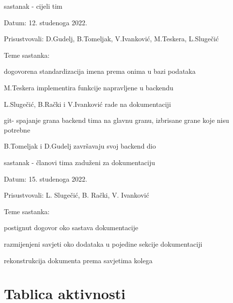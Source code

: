\begin{packed_enum}
			
			\item  sastanak - cijeli tim
			\item[] \begin{packed_item}
				\item Datum: 12. studenoga 2022.
				\item Prisustvovali: D.Gudelj, B.Tomeljak, V.Ivanković, M.Teskera, L.Slugečić
				\item Teme sastanka:
				\begin{packed_item}
					\item dogovorena standardizacija imena prema onima u bazi podataka
					\item M.Teskera implementira funkcije napravljene u backendu
					\item L.Slugečić, B.Rački i V.Ivanković rade na dokumentaciji
					\item git- spajanje grana backend tima na glavnu granu, izbrisane grane koje nisu potrebne
					\item B.Tomeljak i D.Gudelj završavaju svoj backend dio
				\end{packed_item}
			\end{packed_item}
			\item  sastanak - 
            članovi tima zaduženi za dokumentaciju
			\item[] \begin{packed_item}
				\item Datum: 15. studenoga 2022.
				\item Prisustvovali: 
                L. Slugečić, B. Rački, V. Ivanković
				\item Teme sastanka:
				\begin{packed_item}
					\item 
                    postignut dogovor oko sastava dokumentacije
					\item 
                    razmijenjeni savjeti oko dodataka u pojedine sekcije dokumentaciji

					\item rekonstrukcija dokumenta prema savjetima kolega
				
				\end{packed_item}
			\end{packed_item}
			
		\end{packed_enum}
		
		\eject
		\section*{Tablica aktivnosti}
		
